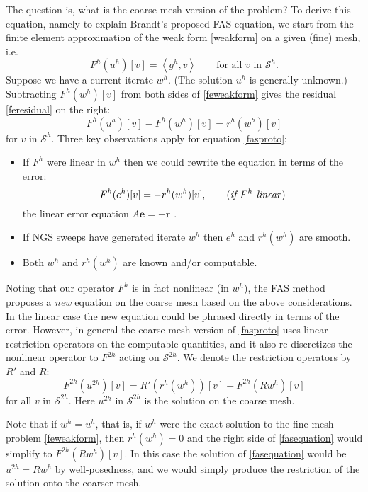 \documentclass[letterpaper,final,12pt,reqno]{amsart}
\newcommand{\be}{\mathbf{e}}
\newcommand{\br}{\mathbf{r}}
\newcommand{\ip}[2]{\left<#1,#2\right>}
\begin{document}
The question is, what is the coarse-mesh version of the problem?  To derive this equation, namely to explain Brandt's proposed FAS equation, we start from the finite element approximation of the weak form \eqref{weakform} on a given (fine) mesh, i.e.
\begin{equation}
  F^h(u^h)[v] = \ip{g^h}{v} \qquad \text{for all } v \text{ in } \mathcal{S}^h.  \label{feweakform}
\end{equation}
Suppose we have a current iterate $w^h$.  (The solution $u^h$ is generally unknown.)  Subtracting $F^h(w^h)[v]$ from both sides of \eqref{feweakform} gives the residual \eqref{feresidual} on the right:
\begin{equation}
  F^h(u^h)[v] - F^h(w^h)[v] = r^h(w^h)[v] \label{fasproto}
\end{equation}
for $v$ in $\mathcal{S}^h$.  Three key observations apply for equation \eqref{fasproto}:
\begin{itemize}
\item If $F^h$ were linear in $w^h$ then we could rewrite the equation in terms of the error:
    $$F^h(e^h)[v] = -r^h(w^h)[v], \qquad (\text{\emph{if $F^h$ linear}})$$
the linear error equation $A\be=-\br$ \cite[Chapter 2]{Bueler2021}.
\item If NGS sweeps have generated iterate $w^h$ then $e^h$ and $r^h(w^h)$ are smooth.
\item Both $w^h$ and $r^h(w^h)$ are known and/or computable.
\end{itemize}

Noting that our operator $F^h$ is in fact nonlinear (in $w^h$), the FAS method  proposes a \emph{new} equation on the coarse mesh based on the above considerations.  In the linear case the new equation could be phrased directly in terms of the error.  However, in general the coarse-mesh version of \eqref{fasproto} uses linear restriction operators on the computable quantities, and it also re-discretizes the nonlinear operator to $F^{2h}$ acting on $\mathcal{S}^{2h}$.  We denote the restriction operators by $R'$ and $R$:
\begin{equation}
  F^{2h}(u^{2h})[v] = R' (r^h(w^h))[v] + F^{2h}(R w^h)[v] \label{fasequation}
\end{equation}
for all $v$ in $\mathcal{S}^{2h}$.  Here $u^{2h}$ in $\mathcal{S}^{2h}$ is the solution on the coarse mesh.

Note that if $w^h=u^h$, that is, if $w^h$ were the exact solution to the fine mesh problem \eqref{feweakform}, then $r^h(w^h)=0$ and the right side of \eqref{fasequation} would simplify to $F^{2h}(R w^h)[v]$.  In this case the solution of \eqref{fasequation} would be $u^{2h} = R w^h$ by well-posedness, and we would simply produce the restriction of the solution onto the coarser mesh.
\end{document}
